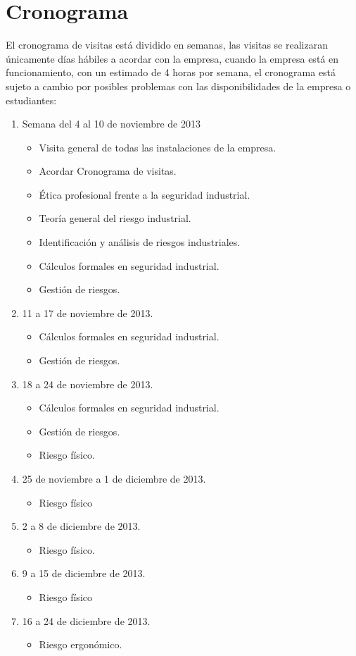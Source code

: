 \documentclass[11pt,graphicx,caption,rotating]{article}
\begin{document}
\section{Cronograma}
\noindent
El cronograma de visitas está dividido en semanas, las visitas se realizaran únicamente días hábiles  a acordar con la empresa, cuando la empresa está en funcionamiento, con un estimado de 4 horas por semana, el cronograma   está sujeto a cambio por posibles problemas con las disponibilidades de la empresa o estudiantes:
\begin{enumerate}
  \item Semana del 4 al 10 de noviembre de 2013
  \begin{itemize}
   \item Visita general de todas las instalaciones de la empresa. \item Acordar Cronograma de visitas.
   \item Ética profesional frente a la seguridad industrial.
   \item Teoría general del riesgo industrial.
   \item Identificación y análisis de riesgos industriales.
   \item Cálculos formales en seguridad industrial.
   \item Gestión de riesgos.
  \end{itemize}
  \item 11 a 17 de noviembre de 2013.
  \begin{itemize} 
   \item Cálculos formales en seguridad industrial.
   \item Gestión de riesgos.
  \end{itemize}
  \item 18 a 24 de noviembre de 2013.
  \begin{itemize}
   \item Cálculos formales en seguridad industrial.
   \item Gestión de riesgos.
   \item Riesgo físico.
  \end{itemize}
  \item 25 de noviembre a 1 de diciembre de 2013.
  \begin{itemize}
   \item Riesgo físico
  \end{itemize}
  \item 2 a 8 de diciembre de 2013.
  \begin{itemize}
   \item Riesgo físico.
  \end{itemize}
  \item 9 a 15 de diciembre de 2013.
  \begin{itemize}
   \item Riesgo físico
  \end{itemize}
  \item 16 a 24 de diciembre de 2013.
  \begin{itemize}
   \item Riesgo ergonómico.
  \end{itemize}
\end{enumerate}  
  
\end{document}
